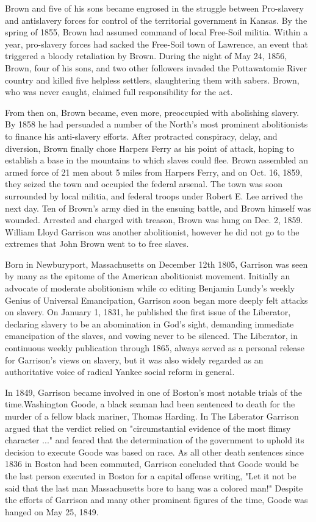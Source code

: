 \documentclass[a4paper]{article}
\begin{document}
Brown and five of his sons became engrosed in the struggle between Pro-slavery and antislavery forces for control of the territorial government in Kansas. By the spring of 1855, Brown had assumed command of local Free-Soil militia. Within a year, pro-slavery forces had sacked the Free-Soil town of Lawrence, an event that triggered a bloody retaliation by Brown. During the night of May 24, 1856, Brown, four of his sons, and two other followers invaded the Pottawatomie River country and killed five helpless settlers, slaughtering them with sabers. Brown, who was never caught, claimed full responsibility for the act.

From then on, Brown became, even more, preoccupied with abolishing slavery. By 1858 he had persuaded a number of the North's most prominent abolitionists to finance his anti-slavery efforts. After protracted conspiracy, delay, and diversion, Brown finally chose Harpers Ferry as his point of attack, hoping to establish a base in the mountains to which slaves could flee. Brown assembled an armed force of 21 men about 5 miles from Harpers Ferry, and on Oct. 16, 1859, they seized the town and occupied the federal arsenal. The town was soon surrounded by local militia, and federal troops under Robert E. Lee arrived the next day. Ten of Brown's army died in the ensuing battle, and Brown himself was wounded. Arrested and charged with treason, Brown was hung on Dec. 2, 1859. William Lloyd Garrison was another abolitionist, however he did not go to the extremes that John Brown went to to free slaves. 




Born in Newburyport, Massachusetts on December 12th 1805, Garrison was seen by many as the epitome of the American abolitionist movement. Initially an advocate of moderate abolitionism while co editing Benjamin Lundy's weekly Genius of Universal Emancipation, Garrison soon began more deeply felt attacks on slavery. On January 1, 1831, he published the first issue of the Liberator, declaring slavery to be an abomination in God's sight, demanding immediate emancipation of the slaves, and vowing never to be silenced. The Liberator, in continuous weekly publication through 1865, always served as a personal release for Garrison's views on slavery, but it was also widely regarded as an authoritative voice of radical Yankee social reform in general.

In 1849, Garrison became involved in one of Boston's most notable trials of the time.Washington Goode, a black seaman had been sentenced to death for the murder of a fellow black mariner, Thomas Harding. In The Liberator Garrison argued that the verdict relied on "circumstantial evidence of the most flimsy character ..." and feared that the determination of the government to uphold its decision to execute Goode was based on race. As all other death sentences since 1836 in Boston had been commuted, Garrison concluded that Goode would be the last person executed in Boston for a capital offense writing, "Let it not be said that the last man Massachusetts bore to hang was a colored man!" Despite the efforts of Garrison and many other prominent figures of the time, Goode was hanged on May 25, 1849.
\end{document}
